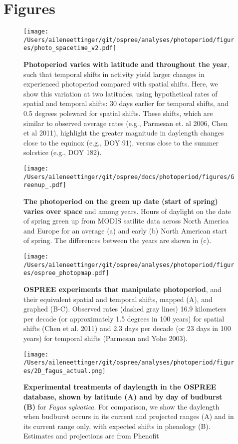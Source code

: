 \documentclass{article}
\begin{document}
\section* {Figures}
\begin{figure}[p]
\centering
\texttt{[image: /Users/aileneettinger/git/ospree/analyses/photoperiod/figures/photo\_spacetime\_v2.pdf]} %
\caption{\textbf{Photoperiod varies with latitude and throughout the year}, such that temporal shifts in activity yield larger changes in experienced photoperiod compared with spatial shifts. Here, we show this variation at two latitudes, using hypothetical rates of spatial and temporal shifts: 30 days earlier for temporal shifts, and 0.5 degrees poleward for spatial shifts. These shifts, which are similar to observed average rates (e.g., Parmesan et. al 2006, Chen et al 2011), highlight the greater magnitude in daylength changes close to the equinox (e.g., DOY 91), versus close to the summer solcstice (e.g., DOY 182).}
 \label{fig:spacetime}%
 \end{figure}
 
\begin{figure}[p]
\centering
\texttt{[image: /Users/aileneettinger/git/ospree/docs/photoperiod/figures/Greenup\_.pdf]} %
\caption{\textbf{The photoperiod on the green up date (start of spring) varies over space} and among years. Hours of daylight on the date of spring green up from MODIS satilite data across North America and Europe for an average (a) and  early (b) North American start of spring. The differences between the years are shown in (c). }
 \label{fig:greenup}%
 \end{figure}
\begin{figure}[p]
\centering
\texttt{[image: /Users/aileneettinger/git/ospree/analyses/photoperiod/figures/ospree\_photopmap.pdf]} 
\caption{\textbf{OSPREE experiments that manipulate photoperiod}, and their equivalent spatial and temporal shifts, mapped (A), and graphed (B-C). Observed rates (dashed gray lines) 16.9 kilometers per decade (or approximately 1.5 degrees in 100 years) for spatial shifts (Chen et al. 2011) and 2.3 days per decade (or 23 days in 100 years) for temporal shifts (Parmesan and Yohe 2003).}
 \label{fig:photomap}
 \end{figure}


 
\begin{figure}[p]
\texttt{[image: /Users/aileneettinger/git/ospree/analyses/photoperiod/figures/2D\_fagus\_actual.png]} 
\caption{\textbf{Experimental treatments of daylength in the OSPREE database, shown by latitude (A) and by day of budburst (B)} for \textit{Fagus sylvatica}. For comparison, we show the daylength when budburst occurs in its current and projected ranges (A) and in its current range only, with expected shifts in phenology (B). Estimates and projections are from Phenofit \citep{duputie2015}}
 \label{fig:fagus}
 \end{figure}
 
\end{document}
